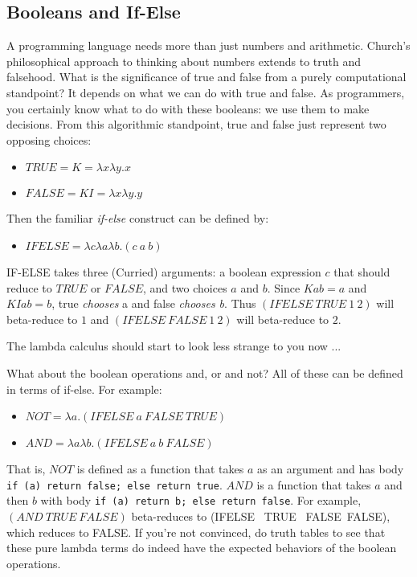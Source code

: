 \subsection{Booleans and If-Else}

A programming language needs more than just numbers and arithmetic.  Church's
philosophical approach to thinking about numbers extends to truth and
falsehood.  What is the significance of true and false from a purely
computational standpoint? It depends on what we can do with true and false.
As programmers, you certainly know what to do with these booleans: we use them
to make decisions.  From this algorithmic standpoint, true and false
just represent two opposing choices:
\begin{itemize}
\item $TRUE = K = \lambda x\lambda y.x$
\item $FALSE = KI = \lambda x\lambda y.y$
\end{itemize}
Then the familiar {\em if-else\/} construct can be defined by:
\begin{itemize}
  \item $IFELSE = \lambda c\lambda a\lambda b.(c~a~b)$
\end{itemize}
IF-ELSE takes three (Curried) arguments: a boolean expression $c$ that
should reduce to $TRUE$ or $FALSE$, and two choices $a$ and $b$.  Since
$Kab=a$ and $KIab=b$, true {\em chooses\/} a and false {\em chooses b}.
Thus $(IFELSE~ TRUE ~1 ~2)$ will beta-reduce to $1$ and
$(IFELSE~ FALSE ~1 ~2)$ will beta-reduce to $2$.

The lambda calculus should start to look less strange to you now ...

What about the boolean operations and, or and not? All of these can be
defined in terms of if-else.  For example:
\begin{itemize}
\item $NOT = \lambda a.(IFELSE~ a ~FALSE ~TRUE)$ 
\item $AND = \lambda a\lambda b.(IFELSE~a~b~FALSE)$
\end{itemize}
That is, $NOT$ is defined as a function that takes $a$ as an argument
and has body \verb+if (a) return false; else return true+.
$AND$ is a function that takes $a$ and then $b$ with body
\verb+if (a) return b; else return false+.
For example, $(AND~ TRUE ~ FALSE)$ beta-reduces to
(IFELSE ~TRUE~ FALSE~FALSE), which reduces to FALSE.
If you're not
convinced, do truth tables to see that these pure lambda terms do indeed have
the expected behaviors of the boolean operations.

